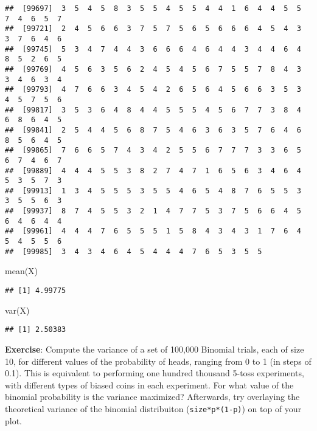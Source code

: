 \documentclass[
]{book}
\newenvironment{Shaded}{\begin{snugshade}}{\end{snugshade}}
\newcommand{\FunctionTok}[1]{\textcolor[rgb]{0.00,0.00,0.00}{#1}}
\newcommand{\NormalTok}[1]{#1}
\begin{document}
\begin{verbatim}
##  [99697]  3  5  4  5  8  3  5  5  4  5  5  4  4  1  6  4  4  5  5  7  4  6  5  7
##  [99721]  2  4  5  6  6  3  7  5  7  5  6  5  6  6  6  4  5  4  3  3  7  6  4  6
##  [99745]  5  3  4  7  4  4  3  6  6  6  4  6  4  4  3  4  4  6  4  8  5  2  6  5
##  [99769]  4  5  6  3  5  6  2  4  5  4  5  6  7  5  5  7  8  4  3  3  4  6  3  4
##  [99793]  4  7  6  6  3  4  5  4  2  6  5  6  4  5  6  6  3  5  3  4  5  7  5  6
##  [99817]  3  5  3  6  4  8  4  4  5  5  5  4  5  6  7  7  3  8  4  6  8  6  4  5
##  [99841]  2  5  4  4  5  6  8  7  5  4  6  3  6  3  5  7  6  4  6  8  5  6  4  5
##  [99865]  7  6  6  5  7  4  3  4  2  5  5  6  7  7  7  3  3  6  5  6  7  4  6  7
##  [99889]  4  4  4  5  5  3  8  2  7  4  7  1  6  5  6  3  4  6  4  5  3  5  7  3
##  [99913]  1  3  4  5  5  5  3  5  5  4  6  5  4  8  7  6  5  5  3  3  5  5  6  3
##  [99937]  8  7  4  5  5  3  2  1  4  7  7  5  3  7  5  6  6  4  5  6  4  6  4  4
##  [99961]  4  4  4  7  6  5  5  5  1  5  8  4  3  4  3  1  7  6  4  5  4  5  5  6
##  [99985]  3  4  3  4  6  4  5  4  4  4  7  6  5  3  5  5
\end{verbatim}

\begin{Shaded}
\begin{Highlighting}[]
\FunctionTok{mean}\NormalTok{(X)}
\end{Highlighting}
\end{Shaded}

\begin{verbatim}
## [1] 4.99775
\end{verbatim}

\begin{Shaded}
\begin{Highlighting}[]
\FunctionTok{var}\NormalTok{(X)}
\end{Highlighting}
\end{Shaded}

\begin{verbatim}
## [1] 2.50383
\end{verbatim}

\textbf{Exercise}: Compute the variance of a set of 100,000 Binomial trials, each of size 10, for different values of the probability of heads, ranging from 0 to 1 (in steps of 0.1). This is equivalent to performing one hundred thousand 5-toss experiments, with different types of biased coins in each experiment. For what value of the binomial probability is the variance maximized? Afterwards, try overlaying the theoretical variance of the binomial distribuiton (\texttt{size*p*(1-p)}) on top of your plot.
\end{document}
